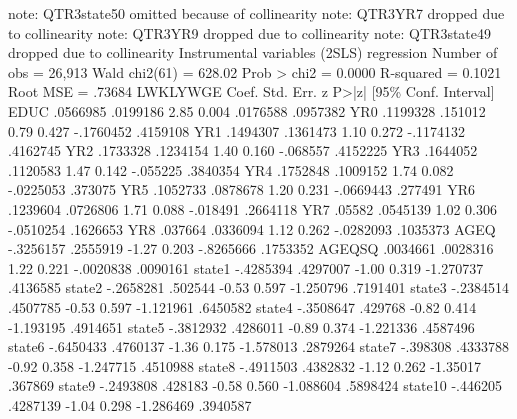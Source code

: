 note: QTR3state50 omitted because of collinearity
note: QTR3YR7 dropped due to collinearity
note: QTR3YR9 dropped due to collinearity
note: QTR3state49 dropped due to collinearity
{\smallskip}
Instrumental variables (2SLS) regression          Number of obs   =     26,913
                                                  Wald chi2(61)   =     628.02
                                                  Prob > chi2     =     0.0000
                                                  R-squared       =     0.1021
                                                  Root MSE        =     .73684
{\smallskip}
    LWKLYWGE {\VBAR}      Coef.   Std. Err.      z    P>|z|     [95\% Conf. Interval]
        EDUC {\VBAR}   .0566985   .0199186     2.85   0.004     .0176588    .0957382
         YR0 {\VBAR}   .1199328    .151012     0.79   0.427    -.1760452    .4159108
         YR1 {\VBAR}   .1494307   .1361473     1.10   0.272    -.1174132    .4162745
         YR2 {\VBAR}   .1733328   .1234154     1.40   0.160     -.068557    .4152225
         YR3 {\VBAR}   .1644052   .1120583     1.47   0.142     -.055225    .3840354
         YR4 {\VBAR}   .1752848   .1009152     1.74   0.082    -.0225053     .373075
         YR5 {\VBAR}   .1052733   .0878678     1.20   0.231    -.0669443     .277491
         YR6 {\VBAR}   .1239604   .0726806     1.71   0.088     -.018491    .2664118
         YR7 {\VBAR}     .05582   .0545139     1.02   0.306    -.0510254    .1626653
         YR8 {\VBAR}    .037664   .0336094     1.12   0.262    -.0282093    .1035373
        AGEQ {\VBAR}  -.3256157   .2555919    -1.27   0.203    -.8265666    .1753352
      AGEQSQ {\VBAR}   .0034661   .0028316     1.22   0.221    -.0020838    .0090161
      state1 {\VBAR}  -.4285394   .4297007    -1.00   0.319    -1.270737    .4136585
      state2 {\VBAR}  -.2658281    .502544    -0.53   0.597    -1.250796    .7191401
      state3 {\VBAR}  -.2384514   .4507785    -0.53   0.597    -1.121961    .6450582
      state4 {\VBAR}  -.3508647    .429768    -0.82   0.414    -1.193195    .4914651
      state5 {\VBAR}  -.3812932   .4286011    -0.89   0.374    -1.221336    .4587496
      state6 {\VBAR}  -.6450433   .4760137    -1.36   0.175    -1.578013    .2879264
      state7 {\VBAR}   -.398308   .4333788    -0.92   0.358    -1.247715    .4510988
      state8 {\VBAR}  -.4911503   .4382832    -1.12   0.262     -1.35017     .367869
      state9 {\VBAR}  -.2493808    .428183    -0.58   0.560    -1.088604    .5898424
     state10 {\VBAR}   -.446205   .4287139    -1.04   0.298    -1.286469    .3940587
